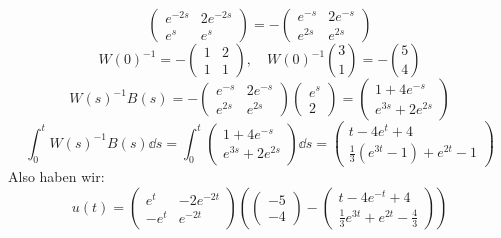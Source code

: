 \begin{beispiel*}
\begin{description}
\[\begin{pmatrix}
		e^{-2s}&2e^{-2s}\\e^s&e^s
		\end{pmatrix}=-\begin{pmatrix}
		e^{-s}&2e^{-s}\\e^{2s}&e^{2s}
		\end{pmatrix} \]
		\[ W(0)^{-1}=-\begin{pmatrix}
		1&2\\1&1
		\end{pmatrix},\quad W(0)^{-1}\binom{3}{1}=-\binom{5}{4} \]
		\[ W(s)^{-1}B(s)=-\begin{pmatrix}
		e^{-s}&2e^{-s}\\e^{2s}&e^{2s}
		\end{pmatrix}\begin{pmatrix}
		e^s\\2
		\end{pmatrix}=\begin{pmatrix}
		1+4e^{-s}\\e^{3s}+2e^{2s}
		\end{pmatrix} \]
		\[ \int_0^t W(s)^{-1}B(s)\dd s=\int_0^t \begin{pmatrix}
		1+4e^{-s}\\e^{3s}+2e^{2s}
		\end{pmatrix}\dd s=\begin{pmatrix}
		t-4e^t+4\\\frac{1}{3}(e^{3t}-1)+e^{2t}-1
		\end{pmatrix}
			 \]
		Also haben wir:
		\[ u(t)=\begin{pmatrix}
		e^t&-2e^{-2t}\\-e^t&e^{-2t}
		\end{pmatrix}\left(\begin{pmatrix}
		-5\\-4
		\end{pmatrix}-\begin{pmatrix}
		t-4e^{-t}+4\\\frac{1}{3}e^{3t}+e^{2t}-\frac{4}{3}
		\end{pmatrix}\right) \]
	\end{description}
\end{beispiel*}
\changesubsection
